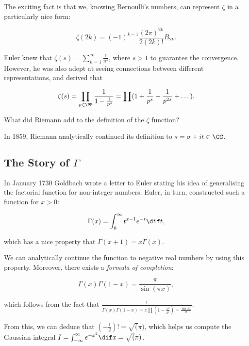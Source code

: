 \documentclass[11pt]{scrartcl}
\begin{document}
  The exciting fact is that we, knowing Bernoulli's numbers, can
  represent $\zeta$ in a particularly nice form:
  
  \begin{equation}
    \zeta(2k) = (-1)^{k-1}\frac{(2\pi)^{2k}}{2(2k)!}B_{2k}.
  \end{equation}

  Euler knew that $\zeta(s) = \sum_{n=1}^{\infty} \frac{1}{n^{s}}$,
  where $s > 1$ to guarantee the convergence. However, he was also
  adept at seeing connections between different representations, and
  derived that

  \begin{equation}
    \zeta(s) = \prod_{p\in \PP}\frac{1}{1-\frac{1}{p^{s}}} = \prod(1+\frac{1}{p^{s}} + \frac{1}{p^{2s}} + \dots).
  \end{equation}

  What did Riemann add to the definition of the $\zeta$ function?

  In 1859, Riemann analytically continued its definition to
  $s = \sigma + it \in \CC$.

  

  \subsection{The Story of $\Gamma$}

  In January 1730 Goldbach wrote a letter to Euler stating his idea of
  generalising the factorial function for non-integer numbers. Euler,
  in turn, constructed such a function for $x > 0$:

  
  \begin{equation}
    \Gamma(x) = \int_{0}^{\infty}t^{x-1}e^{-t}\dif t,
  \end{equation}

  which has a nice property that $\Gamma(x+1) = x\Gamma(x)$.

  We can analytically continue the function to negative real numbers
  by using this property. Moreover, there exists a \textit{formula of completion}:

  
  \begin{equation}
    \Gamma(x)\Gamma(1-x) = \frac{\pi}{\sin(\pi x)},
  \end{equation}

  which follows from the fact that
  $\frac{1}{\Gamma(x)\Gamma(1-x) = x
    \prod(1-\frac{x^{2}}{k^{2}}) = \frac{\sin \pi x}{\pi}}$.

  From this, we can deduce that $(-\frac{1}{2})! = \sqrt(\pi)$, which
  helps us compute the Gaussian integral
  $I = \int_{-\infty}^{\infty}e^{-x^{2}}\dif x = \sqrt(\pi)$.
\end{document}
